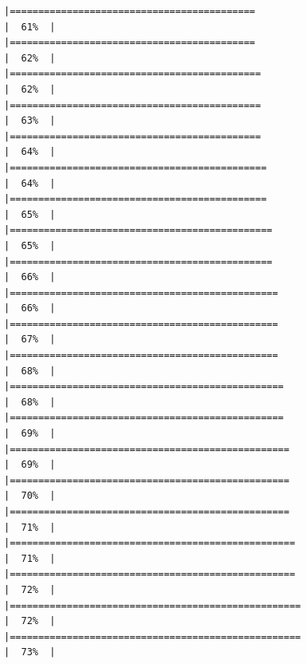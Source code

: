 \documentclass[
  bookmarksnumbered]{article}
\begin{document}
\begin{verbatim}
|===========================================                           |  61%  |                                                                              |===========================================                           |  62%  |                                                                              |============================================                          |  62%  |                                                                              |============================================                          |  63%  |                                                                              |============================================                          |  64%  |                                                                              |=============================================                         |  64%  |                                                                              |=============================================                         |  65%  |                                                                              |==============================================                        |  65%  |                                                                              |==============================================                        |  66%  |                                                                              |===============================================                       |  66%  |                                                                              |===============================================                       |  67%  |                                                                              |===============================================                       |  68%  |                                                                              |================================================                      |  68%  |                                                                              |================================================                      |  69%  |                                                                              |=================================================                     |  69%  |                                                                              |=================================================                     |  70%  |                                                                              |=================================================                     |  71%  |                                                                              |==================================================                    |  71%  |                                                                              |==================================================                    |  72%  |                                                                              |===================================================                   |  72%  |                                                                              |===================================================                   |  73%  |                                                                              
\end{verbatim}
\end{document}
